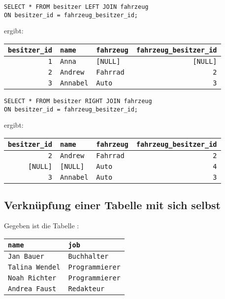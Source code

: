 \begin{lstlisting}
SELECT * FROM besitzer LEFT JOIN fahrzeug
ON besitzer_id = fahrzeug_besitzer_id;
\end{lstlisting}

ergibt:

\begin{tabular}{|r|l|l|r|}
\hline
\textbf{\texttt{besitzer\_id}} & \textbf{\texttt{name}} &
\textbf{\texttt{fahrzeug}} & \textbf{\texttt{fahrzeug\_besitzer\_id}}\\
\hline
\texttt{1} & \texttt{Anna} & \verb|[NULL]| & \verb|[NULL]|\\
\hline 
\texttt{2} & \texttt{Andrew} & \texttt{Fahrrad} & \texttt{2}\\
\hline
\texttt{3} & \texttt{Annabel} & \texttt{Auto} & \texttt{3}\\
\hline
\end{tabular}

\begin{lstlisting}
SELECT * FROM besitzer RIGHT JOIN fahrzeug 
ON besitzer_id = fahrzeug_besitzer_id;
\end{lstlisting}

ergibt:

\begin{tabular}{|r|l|l|r|}
\hline
\textbf{\texttt{besitzer\_id}} & \textbf{\texttt{name}} &
\textbf{\texttt{fahrzeug}} & \textbf{\texttt{fahrzeug\_besitzer\_id}}\\
\hline 
\texttt{2} & \texttt{Andrew} & \texttt{Fahrrad} & \texttt{2}\\
\hline
\verb|[NULL]| & \verb|[NULL]| & \texttt{Auto} & \texttt{4}\\
\hline
\texttt{3} & \texttt{Annabel} & \texttt{Auto} & \texttt{3}\\
\hline
\end{tabular}


\subsection{Verknüpfung einer Tabelle mit sich selbst}

Gegeben ist die Tabelle :

\begin{tabular}{|l|l|}
\hline
\textbf{\texttt{name}} & \textbf{\texttt{job}} \\ \hline
\texttt{Jan Bauer} & \texttt{Buchhalter} \\ \hline
\texttt{Talina Wendel} & \texttt{Programmierer} \\ \hline
\texttt{Noah Richter} & \texttt{Programmierer} \\ \hline
\texttt{Andrea Faust} & \texttt{Redakteur} \\ \hline
\end{tabular}

